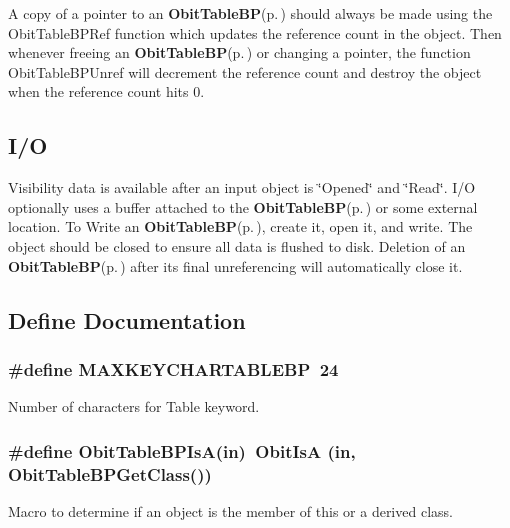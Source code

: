 A copy of a pointer to an {\bf Obit\-Table\-BP}{\rm (p.\,\pageref{structObitTableBP})} should always be made using the Obit\-Table\-BPRef function which updates the reference count in the object. Then whenever freeing an {\bf Obit\-Table\-BP}{\rm (p.\,\pageref{structObitTableBP})} or changing a pointer, the function Obit\-Table\-BPUnref will decrement the reference count and destroy the object when the reference count hits 0.\subsection{I/O}\label{ObitTableBP_8h_ObitTableBPUsage}
Visibility data is available after an input object is \char`\"{}Opened\char`\"{} and \char`\"{}Read\char`\"{}. I/O optionally uses a buffer attached to the {\bf Obit\-Table\-BP}{\rm (p.\,\pageref{structObitTableBP})} or some external location. To Write an {\bf Obit\-Table\-BP}{\rm (p.\,\pageref{structObitTableBP})}, create it, open it, and write. The object should be closed to ensure all data is flushed to disk. Deletion of an {\bf Obit\-Table\-BP}{\rm (p.\,\pageref{structObitTableBP})} after its final unreferencing will automatically close it.

\subsection{Define Documentation}
\subsubsection{\setlength{\rightskip}{0pt plus 5cm}\#define MAXKEYCHARTABLEBP\ 24}\label{ObitTableBP_8h_a0}


Number of characters for Table keyword. 

\subsubsection{\setlength{\rightskip}{0pt plus 5cm}\#define Obit\-Table\-BPIs\-A(in)\ Obit\-Is\-A (in, Obit\-Table\-BPGet\-Class())}\label{ObitTableBP_8h_a3}


Macro to determine if an object is the member of this or a derived class. 

